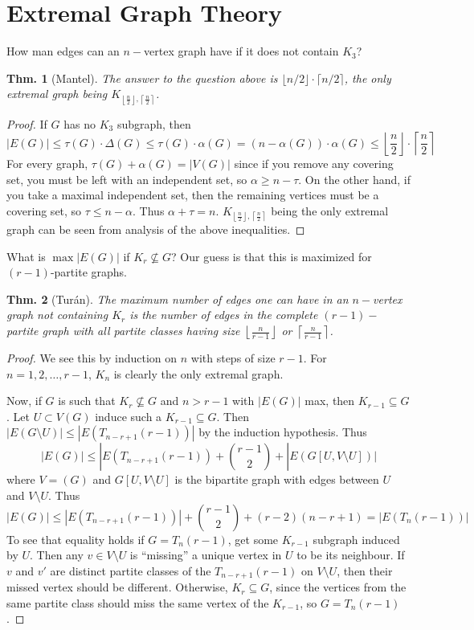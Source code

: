 \documentclass[12pt, a4paper]{book}
\newtheorem{theorem}{Thm.}[section]
\theoremstyle{nonumberplain}
\newtheorem{proof}{Proof}
\begin{document}
\section{Extremal Graph Theory}
How man edges can an $n-$vertex graph have if it does not contain $K_3$?
\begin{theorem}[Mantel]
    The answer to the question above is $\lfloor n/2 \rfloor\cdot\lceil n/2\rceil$, the only extremal graph being $K_{\left\lfloor\frac{n}{2}\right\rfloor,\left\lceil\frac{n}{2}\right\rceil}$.
\end{theorem}
\begin{proof}
    If $G$ has no $K_3$ subgraph, then
    \[|E(G)|\leq\tau(G)\cdot\Delta(G)\leq\tau(G)\cdot\alpha(G)=(n-\alpha(G))\cdot\alpha(G)\leq\left\lfloor\frac{n}{2}\right\rfloor\cdot\left\lceil\frac{n}{2}\right\rceil\]
    For every graph, $\tau(G)+\alpha(G)=|V(G)|$ since if you remove any covering set, you must be left with an independent set, so $\alpha\geq n-\tau$.
    On the other hand, if you take a maximal independent set, then the remaining vertices must be a covering set, so $\tau\leq n-\alpha$.
    Thus $\alpha+\tau=n$.
    $K_{\left\lfloor\frac{n}{2}\right\rfloor,\left\lceil\frac{n}{2}\right\rceil}$ being the only extremal graph can be seen from analysis of the above inequalities.
\end{proof}
What is $\max|E(G)|$ if $K_r\not\subseteq G$?
Our guess is that this is maximized for $(r-1)$-partite graphs.
\begin{theorem}[Tur\'an]
    The maximum number of edges one can have in an $n-$vertex graph not containing $K_r$ is the number of edges in the complete $(r-1)-$partite graph with all partite classes having size $\left\lfloor\frac{n}{r-1}\right\rfloor$ or $\left\lceil\frac{n}{r-1}\right\rceil$.
\end{theorem}
\begin{proof}
    We see this by induction on $n$ with steps of size $r-1$.
    For $n=1,2,\ldots,r-1$, $K_n$ is clearly the only extremal graph.

    Now, if $G$ is such that $K_r\not\subseteq G$ and $n>r-1$ with $|E(G)|$ max, then $K_{r-1}\subseteq G$.
    Let $U\subset V(G)$ induce such a $K_{r-1}\subseteq G$.
    Then $|E(G\setminus U)|\leq|E(T_{n-r+1}(r-1))|$ by the induction hypothesis.
    Thus
    \[|E(G)|\leq|E(T_{n-r+1}(r-1))+\binom{r-1}{2}+|E(G[U,V\setminus U])|\]
    where $V=(G)$ and $G[U,V\setminus U]$ is the bipartite graph with edges between $U$ and $V\setminus U$.
    Thus
    \[|E(G)|\leq|E(T_{n-r+1}(r-1))|+\binom{r-1}{2}+(r-2)(n-r+1)=|E(T_n(r-1))|\]
    To see that equality holds if $G=T_n(r-1)$, get some $K_{r-1}$ subgraph induced by $U$.
    Then any $v\in V\setminus U$ is ``missing'' a unique vertex in $U$ to be its neighbour.
    If $v$ and $v'$ are distinct partite classes of the $T_{n-r+1}(r-1)$ on $V\setminus U$, then their missed vertex should be different.
    Otherwise, $K_r\subseteq G$, since the vertices from the same partite class should miss the same vertex of the $K_{r-1}$, so $G=T_n(r-1)$.
\end{proof}
\end{document}
